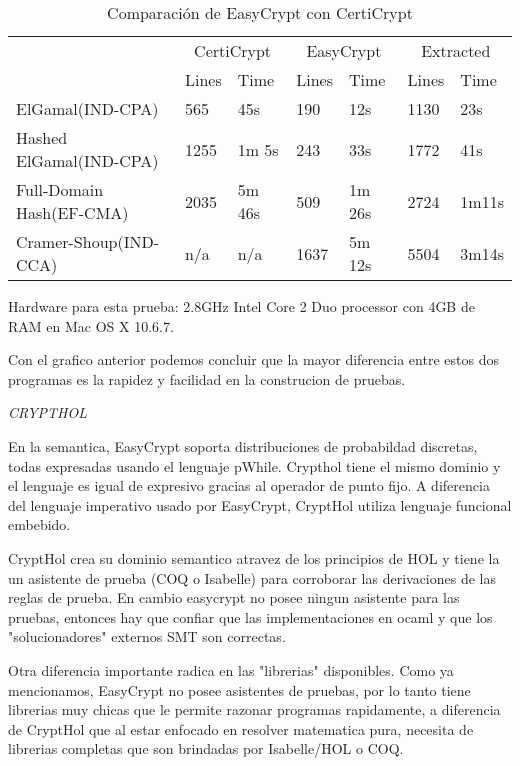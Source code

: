 \documentclass[runningheads,a4paper]{llncs}
\begin{document}
\begin{table}
  \caption{Comparación de EasyCrypt con CertiCrypt}
  \label{tab:simple1}
  \centering
  \begin{tabular}{ |p{3.5cm}|p{1.5cm}|p{1.5cm}|p{1.5cm}|p{1.5cm}|p{1.5cm}|p{1.5cm}|  }
 \hline
 & \multicolumn{2}{|c|}{CertiCrypt} & \multicolumn{2}{|c|}{EasyCrypt} & \multicolumn{2}{|c|}{Extracted} \\\cline{2-7}

 &Lines&Time&Lines&Time&Lines&Time\\\cline{2-7}
 \hline
 ElGamal(IND-CPA) & 565 & 45s & 190 & 12s & 1130 & 23s\\
 Hashed ElGamal(IND-CPA) & 1255  & 1m 5s & 243  & 33s & 1772 & 41s\\
 Full-Domain Hash(EF-CMA) & 2035 & 5m 46s&  509 & 1m 26s & 2724 & 1m11s\\
 Cramer-Shoup(IND-CCA) & n/a & n/a & 1637 & 5m 12s & 5504 & 3m14s\\
 \hline
\end{tabular}
\end{table}

Hardware para esta prueba: 2.8GHz Intel Core 2 Duo processor con 4GB de RAM en Mac OS X 10.6.7.\cite{article5}

Con el grafico anterior podemos concluir que la mayor diferencia entre estos dos programas es la rapidez y facilidad en la construcion de pruebas.

\centerline{\emph{CRYPTHOL}}

En la semantica, EasyCrypt soporta distribuciones de probabildad discretas, todas expresadas usando el lenguaje pWhile. Crypthol tiene el mismo dominio y el lenguaje es igual de expresivo gracias al operador de punto fijo. A diferencia del lenguaje imperativo usado por EasyCrypt, CryptHol utiliza lenguaje funcional embebido.

CryptHol crea su dominio semantico atravez de los principios de HOL y tiene la un asistente de prueba (COQ o Isabelle) para corroborar las derivaciones de las reglas de prueba. En cambio easycrypt no posee ningun asistente para las pruebas, entonces hay que confiar que las implementaciones en ocaml y que los "solucionadores" externos SMT son correctas.

Otra diferencia importante radica en las "librerias" disponibles. Como ya mencionamos, EasyCrypt no posee asistentes de pruebas, por lo tanto tiene librerias muy chicas que le permite razonar programas rapidamente, a diferencia de CryptHol que al estar enfocado en resolver matematica pura, necesita de librerias completas que son brindadas por Isabelle/HOL o COQ.
\end{document}
